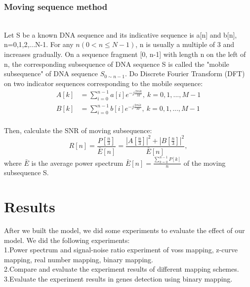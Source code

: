 \documentclass[conference]{IEEEtran}
\begin{document}
\subsubsection{Moving sequence method}
~\\\indent Let S be a known DNA sequence and its indicative sequence is a[n] and b[n], n=0,1,2,...N-1. For any $n(0<n\le N-1)$, n is usually a multiple of 3 and increases gradually. On a sequence fragment [0, n-1] with length n on the left of n, the corresponding subsequence of DNA sequence S is called the "mobile subsequence" of DNA sequence $S_{0\sim n-1}$. Do Discrete Fourier Transform (DFT) on two indicator sequences corresponding to the mobile sequence:
\begin{equation}\label{DFT-sequence2}
    \begin{aligned} 
    A[k]&=\sum_{i=0}^{n-1}{a[i]e^{-j\frac{2\pi ik}{M}}},\ k=0,1,...,M-1\\
    B[k]&=\sum_{i=0}^{n-1}{b[i]e^{-j\frac{2\pi ik}{M}}},\ k=0,1,...,M-1
\end{aligned}
\end{equation}
~\\ \indent Then, calculate the SNR of moving subsequence:
\begin{equation}\label{SNR-move}
    R[n]=\frac{P[\frac{n}{3}]}{\bar{E}[n]}=\frac{|A[\frac{n}{3}]|^2+|B[\frac{n}{3}]|^2}{\bar{E}[n]},
\end{equation}
where $\bar{E}$ is the average power spectrum $\bar{E}[n]=\frac{\sum_{k=0}^{n-1}{P[k]}}{n}$ of the moving subsequence S.

\section{Results}
After we built the model, we did some experiments to evaluate the effect of our model. We did the following experiments:
~\\\indent 1.Power spectrum and signal-noise ratio experiment of voss mapping, z-curve mapping, real number mapping, binary mapping.
~\\\indent 2.Compare and evaluate the experiment results of different mapping schemes.
~\\\indent 3.Evaluate the experiment results in genes detection using binary mapping.
\end{document}
